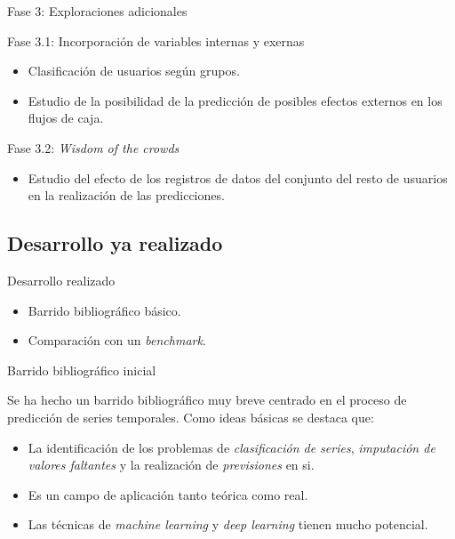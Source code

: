 \documentclass[12pt, aspectratio=169]{beamer} %
\begin{document}
\begin{frame}{Fase 3: Exploraciones adicionales}

  \begin{block}{Fase 3.1: Incorporación de variables internas y exernas}
    \begin{itemize}
    \item Clasificación de usuarios según grupos.
    \item Estudio de la posibilidad de la predicción de posibles efectos externos en los flujos de caja.
    \end{itemize}
  \end{block}

  \begin{block}{Fase 3.2: \textit{Wisdom of the crowds}}
    \begin{itemize}
      \item{Estudio del efecto de los registros de datos del conjunto del resto de usuarios en la realización de las predicciones.}
    \end{itemize}
  \end{block}


\end{frame}

\subsection{Desarrollo ya realizado}

\begin{frame}{Desarrollo realizado}
  \begin{itemize}
  \item Barrido bibliográfico básico.
  \item Comparación con un \textit{benchmark}.
  \end{itemize}

\end{frame}

\begin{frame}{Barrido bibliográfico inicial}
  
  Se ha hecho un barrido bibliográfico muy breve centrado en el proceso de predicción de series temporales. Como ideas básicas se destaca que:
  \begin{itemize}
  \item La identificación de los problemas de \textit{clasificación de series}, \textit{imputación de valores faltantes} y la realización de \textit{previsiones} en si.
  \item Es un campo de aplicación tanto teórica como real.
  \item Las técnicas de \textit{machine learning} y \textit{deep learning} tienen mucho potencial.
  \end{itemize}
\end{frame}
\end{document}
